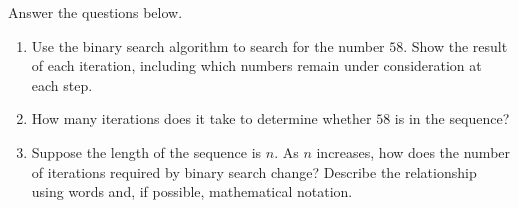 \documentclass[twoside, 10pt]{article}
\begin{document}
Answer the questions below.

\begin{enumerate}[label=\arabic*.]
    \item Use the binary search algorithm to search for the number \(58\).  
    Show the result of each iteration, including which numbers remain under consideration at each step.
    \item How many iterations does it take to determine whether \(58\) is in the sequence?
    \item Suppose the length of the sequence is \(n\).  
    As \(n\) increases, how does the number of iterations required by binary search change?  
    Describe the relationship using words and, if possible, mathematical notation.
\end{enumerate}
\end{document}
